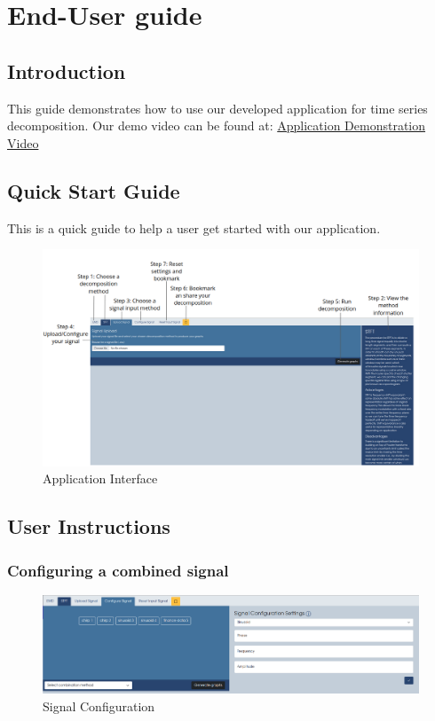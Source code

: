 \section{End-User guide}
\subsection{Introduction}
This guide demonstrates how to use our developed application for time series decomposition.
Our demo video can be found at: 
\href{https://www.overleaf.com/learn}{Application Demonstration Video}

\subsection{Quick Start Guide}
This is a quick guide to help a user get started with our application.
\begin{figure}
\centering
\includegraphics[width=1.0\textwidth]{figures/quickguidesteps.png}
\caption{\label{fig:Application Interface}Application Interface}
\end{figure}


\subsection{User Instructions}
\subsubsection{Configuring a combined signal}
\begin{figure}
\centering
\includegraphics[width=1.0\textwidth]{figures/signalconfig.png}
\caption{\label{fig:Signal Configuration}Signal Configuration}
\end{figure}

